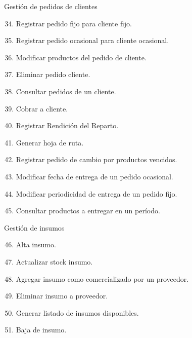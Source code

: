 \documentclass[letterpaper,10pt,english]{sphinxmanual}
\begin{document}
Gestión de pedidos de clientes
\begin{enumerate}
\setcounter{enumi}{33}
\item {} 
Registrar pedido fijo para cliente fijo.

\item {} 
Registrar pedido ocasional para cliente ocasional.

\item {} 
Modificar productos del pedido de cliente.

\item {} 
Eliminar pedido cliente.

\item {} 
Consultar pedidos de un cliente.

\item {} 
Cobrar a cliente.

\item {} 
Registrar Rendición del Reparto.

\item {} 
Generar hoja de ruta.

\item {} 
Registrar pedido de cambio por productos vencidos.

\item {} 
Modificar fecha de entrega de un pedido ocasional.

\item {} 
Modificar periodicidad de entrega de un pedido fijo.

\item {} 
Consultar productos a entregar en un período.

\end{enumerate}

Gestión de insumos
\begin{enumerate}
\setcounter{enumi}{45}
\item {} 
Alta insumo.

\item {} 
Actualizar stock insumo.

\item {} 
Agregar insumo como comercializado por un proveedor.

\item {} 
Eliminar insumo a proveedor.

\item {} 
Generar listado de insumos disponibles.

\item {} 
Baja de insumo.

\end{enumerate}
\end{document}
